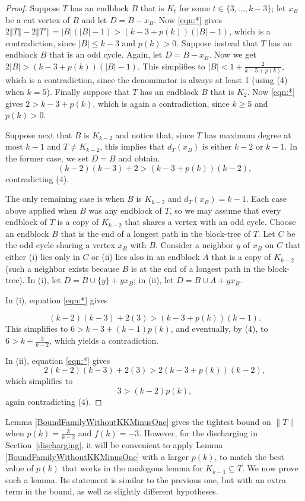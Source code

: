 \documentclass[12pt]{article}
\theoremstyle{plain}
\theoremstyle{definition}
\theoremstyle{remark}
\newcommand{\card}[1]{\left|#1\right|}
\newcommand{\size}[1]{\left\Vert#1\right\Vert}
\begin{document}
\begin{proof}
Suppose $T$ has an endblock $B$ that is $K_t$ for some $t \in \{3,\ldots,
k-3\}$; let $x_B$ be a cut vertex of $B$ and let $D=B-x_B$.
Now \eqref{eqn:*} gives $2\size{T}-2\size{T'} =
\card{B}(\card{B}-1)>(k-3+p(k))(|B|-1)$, which 
is a contradiction, since $|B|\le k-3$ and $p(k)>0$.
Suppose instead that $T$ has an endblock $B$ that is an odd cycle.  Again, let
$D=B-x_B$.  Now we get $2|B|>(k-3+p(k))(|B|-1)$.  This simplifies to $|B|<1+\frac2{k-5+p(k)}$, which is a contradiction, 
since the denominator is always at least 1 (using (4) when $k=5$).
Finally suppose that $T$ has an endblock $B$ that is $K_2$. Now \eqref{eqn:*} gives
$2 > k-3 + p(k)$, which is again a contradiction, since $k \ge 5$ and $p(k) > 0$.
	
Suppose next that $B$ is $K_{k-2}$ and notice that, since $T$ has maximum degree
at most $k-1$ and $T\ne K_{k-2}$, this implies that $d_T(x_B)$ is either $k-2$
or $k-1$.  In the former case, we set $D=B$ and obtain.
	\[(k-2)(k-3) +2 > (k-3 + p(k))(k-2),\]
	contradicting (4).
	
The only remaining case is when $B$ is $K_{k-2}$ and $d_T(x_B) =
k - 1$.  Each case above applied when $B$ was any endblock of $T$, so we may
assume that every endblock of $T$ is a copy of $K_{k-2}$ that shares a vertex
with an odd cycle.  Choose an endblock $B$ that is the end of a longest path in
the block-tree of $T$.  Let $C$ be the odd cycle sharing a vertex $x_B$ with
$B$.  Consider a neighbor $y$ of $x_B$ on $C$ that either (i) lies only in $C$
or (ii) lies also in an endblock $A$ that is a copy of $K_{k-2}$ (such a
neighbor exists because $B$ is at the end of a longest path in the block-tree).
In (i), let $D=B\cup\{y\}+yx_B$; in (ii), let $D=B\cup A+yx_B$.

In (i), equation \eqref{eqn:*} gives

\[(k-2)(k-3)+2(3) > (k-3+p(k))(k-1).\]
%
This simplifies to $6>k-3+(k-1)p(k)$, and eventually, by (4), to $6>k+\frac3{k-2}$, which yields a contradiction.

In (ii), equation \eqref{eqn:*} gives
	\[2(k-2)(k-3) + 2(3) > 2(k-3 + p(k))(k-2),\]
	which simplifies to
	\[3 > (k-2)p(k),\]
	again contradicting (4).
\end{proof}

Lemma \ref{BoundFamilyWithoutKKMinusOne} gives the tightest bound on $\|T\|$
when $p(k) = \frac{3}{k-2}$ and $f(k) = -3$.   However, for the discharging in
Section~\ref{discharging}, it will be convenient to apply Lemma
\ref{BoundFamilyWithoutKKMinusOne} with a larger $p(k)$, to match the best value
of $p(k)$ that works in the analogous lemma for $K_{k-1}\subseteq T$.  We now
prove such a lemma.  Its statement is similar to the
previous one, but with an extra term in the bound, as well as slightly different hypotheses.
\end{document}
